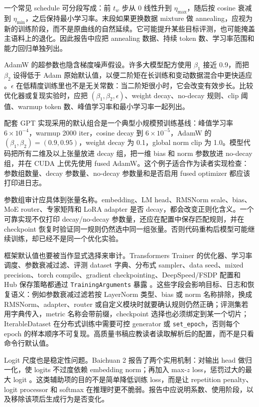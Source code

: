 \documentclass[UTF8,zihao=-4,openany]{ctexbook}
\begin{document}
一个常见 schedule 可分段写成：前 $t_w$ 步从 0 线性升到 $\eta_{\max}$，随后按 cosine 衰减到 $\eta_{\min}$，之后保持最小学习率。末段如果更换数据 mixture 做 annealing，应视为新的训练阶段，而不是原曲线的自然延续。它可能提升某些目标评测，也可能掩盖主语料上的退化。因此报告中应把 annealing 数据、持续 token 数、学习率范围和能力回归单独列出。

AdamW 的超参数也隐含梯度噪声假设。许多大模型配方使用 $\beta_1$ 接近 0.9，而把 $\beta_2$ 设得低于 Adam 原始默认值，以便二阶矩在长训练和变动数据混合中更快适应 \cite{kingma2014adam}。$\epsilon$ 在低精度训练里也不是无关常数：当二阶矩很小时，它会改变有效步长。比较优化器或复现实验时，应把 $(\beta_1,\beta_2,\epsilon)$、weight decay、no-decay 规则、clip 阈值、warmup token 数、峰值学习率和最小学习率一起列出。

配套 GPT 实现采用的默认组合是一个典型小规模预训练基线：峰值学习率 $6\times10^{-4}$，warmup 2000 iter，cosine decay 到 $6\times10^{-5}$，AdamW 的 $(\beta_1,\beta_2)=(0.9,0.95)$，weight decay 为 0.1，global norm clip 为 1.0。模型代码把所有二维及以上张量放进 decay 组，把一维 bias 和 norm 参数放进 no-decay 组，并在 CUDA 上优先使用 fused AdamW。这个例子适合作为读者实现检查：参数组数量、decay 参数量、no-decay 参数量和是否启用 fused optimizer 都应该打印进日志。

参数组审计应具体到张量名称。embedding、LM head、RMSNorm scale、bias、MoE router、专家矩阵和 LoRA adapter 是否 decay，都会改变正则化含义。一个可靠实现不仅打印 decay/no-decay 参数量，还应在配置中保存匹配规则，并在 checkpoint 恢复时验证同一规则仍然选中同一组张量。否则代码重构后模型可能继续训练，却已经不是同一个优化实验。

框架默认值也要被当作显式选择来审计。Transformers Trainer 的优化器、学习率调度、参数衰减过滤、评测 dataset 字典、分布式 sampler、data seed、mixed precision、torch compile、gradient checkpointing、DeepSpeed/FSDP 配置和 Hub 保存策略都通过 \texttt{TrainingArguments} 暴露 \cite{huggingface2026transformerstrainer}。这些字段会影响目标、日志和恢复语义：例如参数衰减过滤若按 LayerNorm 类型、bias 或 norm 名称排除，换成 RMSNorm、adapter、router 或自定义模块时就要确认规则仍然正确；评测集若用字典传入，metric 名称会带前缀，checkpoint 选择也必须绑定到某一个切片；IterableDataset 在分布式训练中需要可控 generator 或 \texttt{set\_epoch}，否则每个 epoch 的样本顺序不可复现。高质量书稿应教读者读取解析后的配置，而不是只看命令行默认值。

Logit 尺度也是稳定性问题。Baichuan 2 报告了两个实用机制：对输出 head 做归一化，使 logits 不过度依赖 embedding norm；再加入 max-$z$ loss，惩罚过大的最大 logit \cite{yang2023baichuan2}。这类辅助项的目的不是简单降低训练 loss，而是让 repetition penalty、logit processor 和 softmax 在推理时更不脆弱。报告中应说明系数、使用阶段，以及移除该项后生成行为是否变化。
\end{document}
